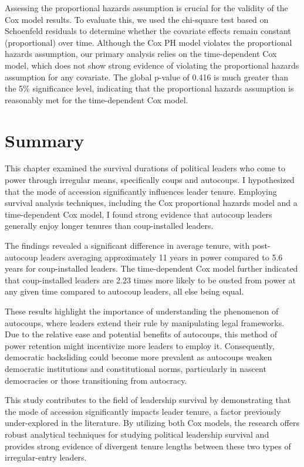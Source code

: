 \documentclass[
  12pt,
]{report}
\begin{document}
Assessing the proportional hazards assumption is crucial for the
validity of the Cox model results. To evaluate this, we used the
chi-square test based on Schoenfeld residuals to determine whether the
covariate effects remain constant (proportional) over time. Although the
Cox PH model violates the proportional hazards assumption, our primary
analysis relies on the time-dependent Cox model, which does not show
strong evidence of violating the proportional hazards assumption for any
covariate. The global p-value of 0.416 is much greater than the 5\%
significance level, indicating that the proportional hazards assumption
is reasonably met for the time-dependent Cox model.

\section{Summary}\label{summary-2}

This chapter examined the survival durations of political leaders who
come to power through irregular means, specifically coups and autocoups.
I hypothesized that the mode of accession significantly influences
leader tenure. Employing survival analysis techniques, including the Cox
proportional hazards model and a time-dependent Cox model, I found
strong evidence that autocoup leaders generally enjoy longer tenures
than coup-installed leaders.

The findings revealed a significant difference in average tenure, with
post-autocoup leaders averaging approximately 11 years in power compared
to 5.6 years for coup-installed leaders. The time-dependent Cox model
further indicated that coup-installed leaders are 2.23 times more likely
to be ousted from power at any given time compared to autocoup leaders,
all else being equal.

These results highlight the importance of understanding the phenomenon
of autocoups, where leaders extend their rule by manipulating legal
frameworks. Due to the relative ease and potential benefits of
autocoups, this method of power retention might incentivize more leaders
to employ it. Consequently, democratic backsliding could become more
prevalent as autocoups weaken democratic institutions and constitutional
norms, particularly in nascent democracies or those transitioning from
autocracy.

This study contributes to the field of leadership survival by
demonstrating that the mode of accession significantly impacts leader
tenure, a factor previously under-explored in the literature. By
utilizing both Cox models, the research offers robust analytical
techniques for studying political leadership survival and provides
strong evidence of divergent tenure lengths between these two types of
irregular-entry leaders.
\end{document}
